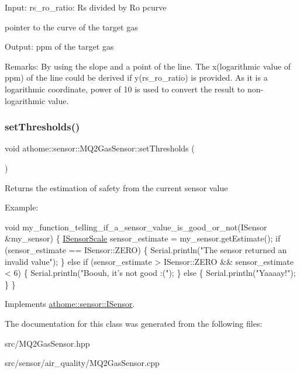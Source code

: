 Input\+: rs\+\_\+ro\+\_\+ratio\+: Rs divided by Ro pcurve

pointer to the curve of the target gas

Output\+: ppm of the target gas

Remarks\+: By using the slope and a point of the line. The x(logarithmic value of ppm) of the line could be derived if y(rs\+\_\+ro\+\_\+ratio) is provided. As it is a logarithmic coordinate, power of 10 is used to convert the result to non-\/logarithmic value. \mbox{\label{classathome_1_1sensor_1_1_m_q2_gas_sensor_a69de9f45b9babd2d111b4ce020d7c83e}} 
\subsubsection{\texorpdfstring{set\+Thresholds()}{setThresholds()}}
{\footnotesize\ttfamily void athome\+::sensor\+::\+M\+Q2\+Gas\+Sensor\+::set\+Thresholds (\begin{DoxyParamCaption}\item[{const \mbox{\hyperlink{structathome_1_1sensor_1_1_i_sensor_1_1_i_sensor_thresholds}{I\+Sensor\+Thresholds}} \&}]{ }\end{DoxyParamCaption})\hspace{0.3cm}{\ttfamily [virtual]}}

Returns the estimation of safety from the current sensor value

Example\+:


\begin{DoxyCode}
\textcolor{keywordtype}{void} my\_function\_telling\_if\_a\_sensor\_value\_is\_good\_or\_not(ISensor &my\_sensor) \{
  \mbox{\hyperlink{classathome_1_1sensor_1_1_i_sensor_aa70bc27a4c17c86caf96cca776541ddf}{ISensorScale}} sensor\_estimate = my\_sensor.getEstimate();
  \textcolor{keywordflow}{if} (sensor\_estimate == ISensor::ZERO) \{
    Serial.println(\textcolor{stringliteral}{"The sensor returned an invalid value"});
  \}
  \textcolor{keywordflow}{else} \textcolor{keywordflow}{if} (sensor\_estimate > ISensor::ZERO && sensor\_estimate < 6) \{
    Serial.println(\textcolor{stringliteral}{"Boouh, it's not good :("});
  \}
  \textcolor{keywordflow}{else} \{
    Serial.println(\textcolor{stringliteral}{"Yaaaay!"});
  \}
\}
\end{DoxyCode}
 

Implements \mbox{\hyperlink{classathome_1_1sensor_1_1_i_sensor_af86df8538fecfcfc670b4adfbbde6abb}{athome\+::sensor\+::\+I\+Sensor}}.



The documentation for this class was generated from the following files\+:\begin{DoxyCompactItemize}
\item 
src/M\+Q2\+Gas\+Sensor.\+hpp\item 
src/sensor/air\+\_\+quality/M\+Q2\+Gas\+Sensor.\+cpp\end{DoxyCompactItemize}
